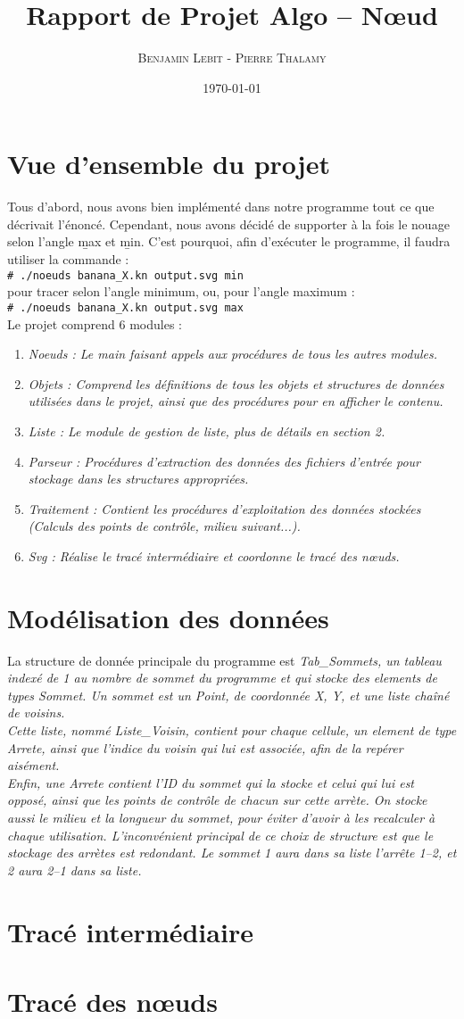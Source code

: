 \documentclass[10.9pt]{article}
\title{Rapport de Projet Algo -- Nœud}
\author{\textsc{Benjamin Lebit} - \textsc{Pierre Thalamy}}
\date{\today}
\newcommand{\shellcmd}[1]{\\\indent\indent\texttt{\footnotesize\# #1}\\}
\begin{document}
\maketitle

\section {Vue d'ensemble du projet}
Tous d'abord, nous avons bien implémenté dans notre programme tout ce
que décrivait l'énoncé. Cependant, nous avons décidé de supporter à la
fois le nouage selon l'angle \b{max} et \b{min}. C'est pourquoi, afin
d'exécuter le programme, il faudra utiliser la commande :
\shellcmd{./noeuds banana\_X.kn output.svg min} 
pour tracer selon l'angle minimum, ou, pour l'angle maximum :
\shellcmd{./noeuds banana\_X.kn output.svg max} 

Le projet comprend 6 modules :
\begin{enumerate}
\item \em{Noeuds} : Le main faisant appels aux procédures de tous
  les autres modules.
\item \em{Objets} : Comprend les définitions de tous les objets et
  structures de données utilisées dans le projet, ainsi que des
  procédures pour en afficher le contenu.
\item \em{Liste} : Le module de gestion de liste, plus de détails en
  section 2.
\item \em{Parseur} : Procédures d'extraction des données des fichiers
  d'entrée pour stockage dans les structures appropriées.
\item \em{Traitement} : Contient les procédures d'exploitation des
  données stockées (Calculs des points de contrôle, milieu
  suivant...).
\item \em{Svg} : Réalise le tracé intermédiaire et coordonne le tracé des nœuds.
\end{enumerate}

\section {Modélisation des données}
La structure de donnée principale du programme est \em{Tab\_Sommets},
un tableau indexé de 1 au nombre de sommet du programme et qui stocke
des elements de types \em{Sommet}. Un sommet est un \em{Point}, de
coordonnée \em{X, Y}, et une liste chaîné de voisins. \\
Cette liste, nommé \em{Liste\_Voisin}, contient pour chaque cellule,
un element de type \em{Arrete}, ainsi que l'indice du voisin qui lui
est associée, afin de la repérer aisément. \\
Enfin, une \em{Arrete} contient l'ID du sommet qui la stocke et celui
qui lui est opposé, ainsi que les points de contrôle de chacun sur
cette arrète. On stocke aussi le milieu et la longueur du sommet, pour
éviter d'avoir à les recalculer à chaque utilisation. L'inconvénient
principal de ce choix de structure est que le stockage des arrètes est
redondant. Le sommet 1 aura dans sa liste l'arrête 1--2, et 2 aura
2--1 dans sa liste.

\section {Tracé intermédiaire}

\section {Tracé des nœuds}
\end{document}
